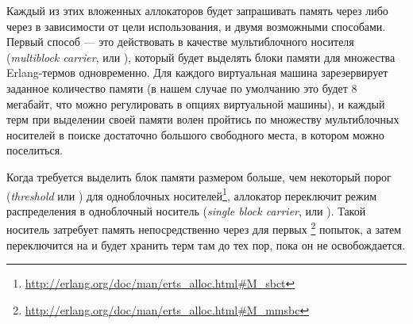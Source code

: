 Каждый из этих вложенных аллокаторов будет запрашивать память через  либо через  в зависимости от цели использования, и двумя возможными способами. Первый способ --- это действовать в качестве мультиблочного носителя (\emph{multiblock carrier}, или ), который будет выделять блоки памяти для множества Erlang-термов одновременно. Для каждого  виртуальная машина зарезервирует заданное количество памяти (в нашем случае по умолчанию это будет 8 мегабайт, что можно регулировать в опциях виртуальной машины), и каждый терм при выделении своей памяти волен пройтись по множеству мультиблочных носителей в поиске достаточно большого свободного места, в котором можно поселиться.

Когда требуется выделить блок памяти размером больше, чем некоторый порог (\emph{threshold} или ) для одноблочных носителей\footnote{\href{http://erlang.org/doc/man/erts\_alloc.html\#M\_sbct}{http://erlang.org/doc/man/erts\_alloc.html\#M\_sbct}}, аллокатор переключит режим распределения в одноблочный носитель (\emph{single block carrier}, или ). Такой носитель затребует память непосредственно через  для первых \footnote{\href{http://erlang.org/doc/man/erts\_alloc.html\#M\_mmsbc}{http://erlang.org/doc/man/erts\_alloc.html\#M\_mmsbc}} попыток, а затем переключится на  и будет хранить терм там до тех пор, пока он не освобождается.

